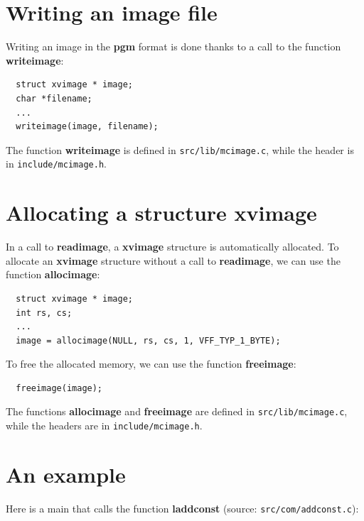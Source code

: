 \documentclass{article}
\begin{document}
\section{Writing an image file}

Writing an image in the {\bf pgm} format is done thanks to a call to
the function {\bf writeimage}:

\begin{verbatim}
  struct xvimage * image;
  char *filename;
  ...
  writeimage(image, filename);
\end{verbatim}

The function {\bf writeimage} is defined in \verb|src/lib/mcimage.c|,
while the header is in \verb|include/mcimage.h|.

\section{Allocating a structure {\bf xvimage}}

In a call to {\bf readimage}, a {\bf xvimage} structure is
automatically allocated. To allocate an {\bf xvimage} structure
without a call to {\bf readimage}, we can use the function {\bf
  allocimage}:

\begin{verbatim}
  struct xvimage * image;
  int rs, cs;
  ...  
  image = allocimage(NULL, rs, cs, 1, VFF_TYP_1_BYTE);
\end{verbatim}

To free the allocated memory, we can use the function
{\bf freeimage}:

\begin{verbatim}
  freeimage(image);
\end{verbatim}

The functions {\bf allocimage} and {\bf freeimage} are defined in
\verb|src/lib/mcimage.c|, while the headers are in
\verb|include/mcimage.h|.

\section{An example}
Here is a main that calls the function
{\bf laddconst} (source: \verb|src/com/addconst.c|):
\end{document}
